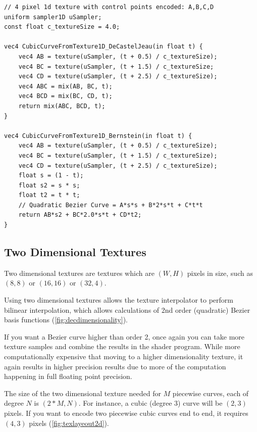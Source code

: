 \documentclass{jcgt}
\begin{document}
\begin{lstlisting}[caption={GLSL for evaluating a cubic curve encoded in a 4 pixel 1d texture.  Linear texture sampling used to evaluate the first level of the De Casteljeau algorithm, then the process is continued both with the De Casteljeau algorithm, as well as the Bernstein form of a quadratic Bezier curve.}, label={lst:GLSLCubicTexture1D}]
// 4 pixel 1d texture with control points encoded: A,B,C,D
uniform sampler1D uSampler; 
const float c_textureSize = 4.0;

vec4 CubicCurveFromTexture1D_DeCastelJeau(in float t) {
    vec4 AB = texture(uSampler, (t + 0.5) / c_textureSize);
    vec4 BC = texture(uSampler, (t + 1.5) / c_textureSize;
    vec4 CD = texture(uSampler, (t + 2.5) / c_textureSize);
    vec4 ABC = mix(AB, BC, t);
    vec4 BCD = mix(BC, CD, t);
    return mix(ABC, BCD, t);
}

vec4 CubicCurveFromTexture1D_Bernstein(in float t) {
    vec4 AB = texture(uSampler, (t + 0.5) / c_textureSize);
    vec4 BC = texture(uSampler, (t + 1.5) / c_textureSize);
    vec4 CD = texture(uSampler, (t + 2.5) / c_textureSize);
    float s = (1 - t);
    float s2 = s * s;
    float t2 = t * t;
    // Quadratic Bezier Curve = A*s*s + B*2*s*t + C*t*t
    return AB*s2 + BC*2.0*s*t + CD*t2;
}
\end{lstlisting}

\subsection{Two Dimensional Textures}

Two dimensional textures are textures which are $(W,H)$ pixels in size, such as $(8,8)$ or $(16,16)$ or $(32,4)$.

Using two dimensional textures allows the texture interpolator to perform bilinear interpolation, which allows calculations of 2nd order (quadratic) Bezier basis functions (\autoref{fig:decdimensionality}).

If you want a Bezier curve higher than order 2, once again you can take more texture samples and combine the results in the shader program.  While more computationally expensive that moving to a higher dimensionality texture, it again results in higher precision results due to more of the computation happening in full floating point precision.

The size of the two dimensional texture needed for $M$ piecewise curves, each of degree $N$ is $(2*M,N)$. For instance, a cubic (degree 3) curve will be $(2,3)$ pixels.  If you want to encode two piecewise cubic curves end to end, it requires $(4,3)$ pixels (\autoref{fig:texlayeout2d}).
\end{document}
